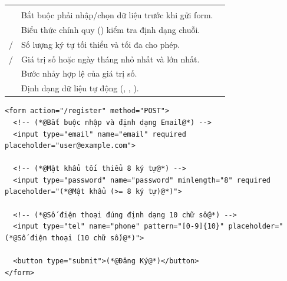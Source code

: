 \begin{prettyTableBox}
\begin{tabularx}{\linewidth}{K{3.0cm} Z Z}
 &  &  \\
 & Bắt buộc phải nhập/chọn dữ liệu trước khi gửi form. &  \\
 & Biểu thức chính quy () kiểm tra định dạng chuỗi. &  \\
 /  & Số lượng ký tự tối thiểu và tối đa cho phép. &  \\
 /  & Giá trị số hoặc ngày tháng nhỏ nhất và lớn nhất. &  \\
 & Bước nhảy hợp lệ của giá trị số. &  \\
 & Định dạng dữ liệu tự động (, , ). &  \\
\end{tabularx}
\end{prettyTableBox}

\begin{codeWindow}
\begin{lstlisting}[language=HTML5]
<form action="/register" method="POST">
  <!-- (*@Bắt buộc nhập và định dạng Email@*) -->
  <input type="email" name="email" required placeholder="user@example.com">
  
  <!-- (*@Mật khẩu tối thiểu 8 ký tự@*) -->
  <input type="password" name="password" minlength="8" required placeholder="(*@Mật khẩu (>= 8 ký tự)@*)">
  
  <!-- (*@Số điện thoại đúng định dạng 10 chữ số@*) -->
  <input type="tel" name="phone" pattern="[0-9]{10}" placeholder="(*@Số điện thoại (10 chữ số)@*)">
  
  <button type="submit">(*@Đăng Ký@*)</button>
</form>
\end{lstlisting}
\end{codeWindow}

